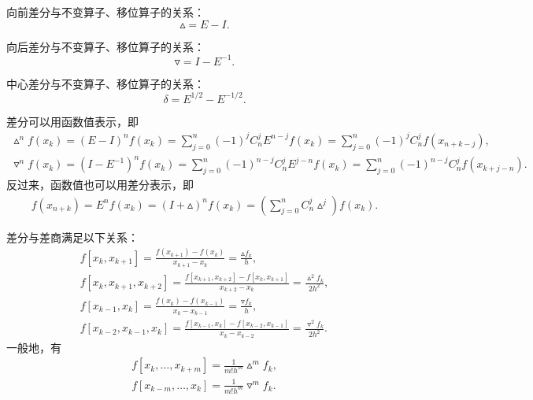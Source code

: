 \begin{property}
向前差分与不变算子、移位算子的关系：\begin{equation*}
	\vartriangle = E - I.
\end{equation*}
\end{property}

\begin{property}
向后差分与不变算子、移位算子的关系：\begin{equation*}
	\triangledown = I - E^{-1}.
\end{equation*}
\end{property}

\begin{property}
中心差分与不变算子、移位算子的关系：\begin{equation*}
	\delta = E^{1/2} - E^{-1/2}.
\end{equation*}
\end{property}

差分可以用函数值表示，即\begin{gather*}
	\vartriangle^n f(x_k)
	= (E - I)^n f(x_k)
	= \sum_{j=0}^n (-1)^j C_n^j E^{n-j} f(x_k)
	= \sum_{j=0}^n (-1)^j C_n^j f(x_{n+k-j}), \\
	\triangledown^n f(x_k)
	= (I - E^{-1})^n f(x_k)
	= \sum_{j=0}^n (-1)^{n-j} C_n^j E^{j-n} f(x_k)
	= \sum_{j=0}^n (-1)^{n-j} C_n^j f(x_{k+j-n}).
\end{gather*}
反过来，函数值也可以用差分表示，即\begin{gather*}
	f(x_{n+k})
	= E^n f(x_k)
	= (I + \vartriangle)^n f(x_k)
	= \left( \sum_{j=0}^n C_n^j \vartriangle^j \right) f(x_k).
\end{gather*}

差分与差商满足以下关系：\begin{gather*}
	f[x_k,x_{k+1}]
	= \frac{f(x_{k+1}) - f(x_k)}{x_{k+1} - x_k}
	= \frac{\vartriangle f_k}{h}, \\
	f[x_k,x_{k+1},x_{k+2}]
	= \frac{f[x_{k+1},x_{k+2}] - f[x_k,x_{k+1}]}{x_{k+2} - x_k}
	= \frac{\vartriangle^2 f_k}{2 h^2}, \\
	f[x_{k-1},x_k]
	= \frac{f(x_k) - f(x_{k-1})}{x_k - x_{k-1}}
	= \frac{\triangledown f_k}{h}, \\
	f[x_{k-2},x_{k-1},x_k]
	= \frac{f[x_{k-1},x_k] - f[x_{k-2},x_{k-1}]}{x_k - x_{k-2}}
	= \frac{\triangledown^2 f_k}{2 h^2}.
\end{gather*}
一般地，有\begin{gather}
	f[x_k,\dotsc,x_{k+m}]
	= \frac1{m! h^m} \vartriangle^m f_k,
		\label{equation:牛顿插值.用向前差分表示差商} \\
	f[x_{k-m},\dotsc,x_k]
	= \frac1{m! h^m} \triangledown^m f_k.
\end{gather}

